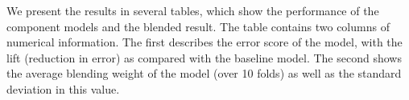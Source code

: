 \documentclass{article}
\begin{document}

We present the results in several tables, which show the performance of the component models and the blended result.  The table contains two columns of numerical information.  The first describes the error score of the model, with the lift (reduction in error) as compared with the baseline model.  The second shows the average blending weight of the model (over 10 folds) as well as the standard deviation in this value.

\end{document}
